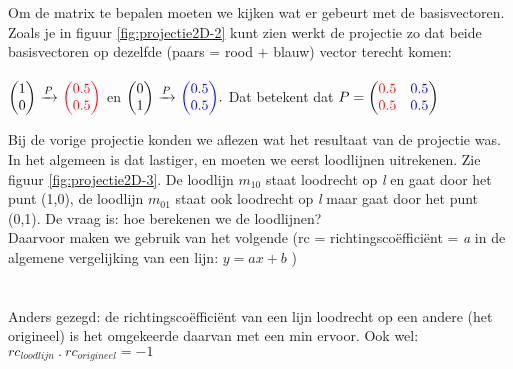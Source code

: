 
Om de matrix te bepalen moeten we kijken wat er gebeurt met de basisvectoren. 	
Zoals je in figuur \ref{fig:projectie2D-2} kunt zien werkt de projectie zo dat beide basisvectoren op dezelfde (paars = rood + blauw) vector terecht komen:\\ \\
$ \vectwee{1}{0}  \  \xrightarrow{P}  \   \vectwee[red]{0.5}{0.5} $ \quad en \quad 
$ \vectwee{0}{1}  \  \xrightarrow{P}  \   \vectwee[blue]{0.5}{0.5}. $ 
\quad Dat betekent dat $ P = \begin{pmatrix} {\color{red}0.5}&{\color{blue}0.5} \\ {\color{red}0.5}&{\color{blue}0.5} \end{pmatrix} $



Bij de vorige projectie konden we aflezen wat het resultaat van de projectie was. In het algemeen is dat lastiger, en moeten we eerst loodlijnen uitrekenen. Zie figuur  \ref{fig:projectie2D-3}. De loodlijn $ m_{10} $ staat loodrecht op\textit{ l} en gaat door het punt (1,0), de loodlijn $ m_{01} $ staat ook loodrecht op \textit{l} maar gaat door het punt (0,1). De vraag is: hoe berekenen we de loodlijnen? \\ Daarvoor maken we gebruik van het volgende  (rc = richtingscoëfficiënt = \textit{a} in de algemene vergelijking van een lijn: $ y = ax + b $ )\\ \\ 

 \\ Anders gezegd: de richtingscoëfficiënt van een lijn loodrecht op een andere (het origineel) is het omgekeerde daarvan met een min ervoor. 
Ook wel: $ rc_{loodlijn}\ . \ rc_{origineel} = -1 $\\ \\

\\

